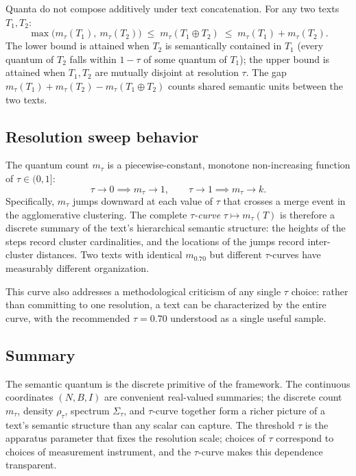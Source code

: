 \documentclass[11pt]{article}
\begin{document}
Quanta do not compose additively under text concatenation. For any two texts $T_1, T_2$:
\[
\max\bigl(m_\tau(T_1),\ m_\tau(T_2)\bigr) \;\leq\; m_\tau(T_1 \oplus T_2) \;\leq\; m_\tau(T_1) + m_\tau(T_2).
\]
The lower bound is attained when $T_2$ is semantically contained in $T_1$ (every quantum of $T_2$ falls within $1 - \tau$ of some quantum of $T_1$); the upper bound is attained when $T_1, T_2$ are mutually disjoint at resolution $\tau$. The gap $m_\tau(T_1) + m_\tau(T_2) - m_\tau(T_1 \oplus T_2)$ counts shared semantic units between the two texts.

\subsection{Resolution sweep behavior}

The quantum count $m_\tau$ is a piecewise-constant, monotone non-increasing function of $\tau \in (0,1]$:
\[
\tau \to 0 \implies m_\tau \to 1, \qquad \tau \to 1 \implies m_\tau \to k.
\]
Specifically, $m_\tau$ jumps downward at each value of $\tau$ that crosses a merge event in the agglomerative clustering. The complete \emph{$\tau$-curve} $\tau \mapsto m_\tau(T)$ is therefore a discrete summary of the text's hierarchical semantic structure: the heights of the steps record cluster cardinalities, and the locations of the jumps record inter-cluster distances. Two texts with identical $m_{0.70}$ but different $\tau$-curves have measurably different organization.

This curve also addresses a methodological criticism of any single $\tau$ choice: rather than committing to one resolution, a text can be characterized by the entire curve, with the recommended $\tau = 0.70$ understood as a single useful sample.

\subsection{Summary}

The semantic quantum is the discrete primitive of the framework. The continuous coordinates $(N, B, I)$ are convenient real-valued summaries; the discrete count $m_\tau$, density $\rho_\tau$, spectrum $\Sigma_\tau$, and $\tau$-curve together form a richer picture of a text's semantic structure than any scalar can capture. The threshold $\tau$ is the apparatus parameter that fixes the resolution scale; choices of $\tau$ correspond to choices of measurement instrument, and the $\tau$-curve makes this dependence transparent.
\end{document}
